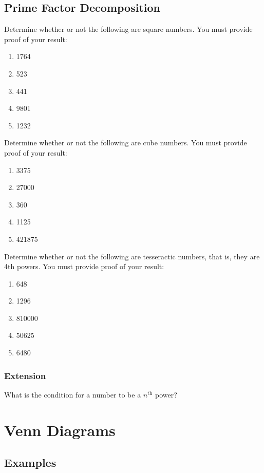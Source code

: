 \documentclass{article}
\begin{document}
\subsection*{Prime Factor Decomposition}

Determine whether or not the following are square numbers. You must provide proof of your result:

\begin{enumerate}
    \item 1764
    \item 523
    \item 441
    \item 9801
    \item 1232
\end{enumerate}

Determine whether or not the following are cube numbers. You must provide proof of your result:

\begin{enumerate}
    \item 3375
    \item 27000
    \item 360
    \item 1125
    \item 421875
\end{enumerate}

Determine whether or not the following are tesseractic numbers, that is, they are 4th powers. You must provide proof of your result:

\begin{enumerate}
    \item 648
    \item 1296
    \item 810000
    \item 50625
    \item 6480
\end{enumerate}

\subsubsection*{Extension}

What is the condition for a number to be a \(n^{\text{th}}\) power?

\newpage

\section{Venn Diagrams}

\subsection*{Examples}
\end{document}
